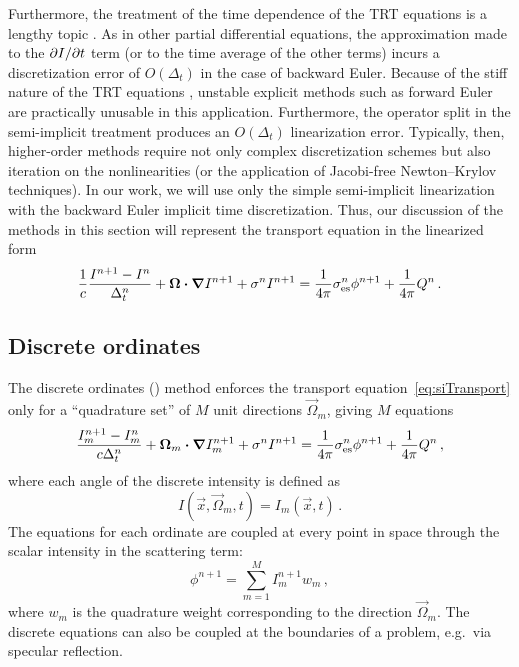 Furthermore, the treatment of the time dependence of the TRT equations is a lengthy
topic \cite{Low2004}. As in other partial differential equations, the
approximation made to the
${\partial I}/{\partial t}$ term (or to the time average of the other terms) incurs a
discretization error of $O(\Delta_t)$ in the case of backward Euler.
Because of the stiff nature of the TRT equations \cite{Kno2003}, unstable explicit
methods such as forward Euler are practically unusable in this application.
Furthermore, the operator split in the semi-implicit treatment produces an
$O(\Delta_t)$ linearization error. Typically, then,
higher-order methods require not only complex discretization schemes but also
iteration on the nonlinearities (or the
application of Jacobi-free Newton--Krylov techniques). In our work, we will use
only the simple semi-implicit linearization with the backward Euler implicit time
discretization. Thus, our discussion of the methods in this section will represent
the transport equation in the linearized form
\begin{equation}\label{eq:siTransport}
  \frac{1}{c} \frac{I^{n+1} - I^n}{\Delta_t^n}
  + \bm{\Omega} \bm{\cdot} \bm{\nabla} I^{n+1}
  + \sigma^n I^{n+1}
  = \frac{1}{4\pi} \sigma_\mathrm{es}^n \phi^{n+1}
  + \frac{1}{4\pi} Q^n\,.
\end{equation}

\subsection{Discrete ordinates}

The discrete ordinates (\SN) method enforces the transport
equation~\eqref{eq:siTransport} only for a ``quadrature set'' of $M$ unit
directions $\vec{\Omega}_m$, giving $M$ equations
\begin{equation}\label{eq:snTransport}
  \frac{I_{m}^{n+1} - I_{m}^n}{c \Delta_t^n}
  + \bm{\Omega}_{m} \bm{\cdot} \bm{\nabla} I_{m}^{n+1}
  + \sigma^n I^{n+1}
  = \frac{1}{4\pi} \sigma_\mathrm{es}^n \phi^{n+1}
  + \frac{1}{4\pi} Q^n\,,
\end{equation}
where each angle of the discrete intensity is defined as
\begin{equation*}
  I(\vec{x},\vec{\Omega}_m,t) = I_m(\vec{x},t)\,.
\end{equation*}
The equations for each ordinate are coupled at every point in space through the
scalar intensity in the scattering term:
\begin{equation*}
  \phi^{n+1} = \sum_{m=1}^M I_m^{n+1} w_m \,,
\end{equation*}
where $w_m$ is the quadrature weight corresponding to the direction
$\vec{\Omega}_m$.  The discrete equations can also be coupled at the boundaries
of a problem, e.g.~via specular reflection.

